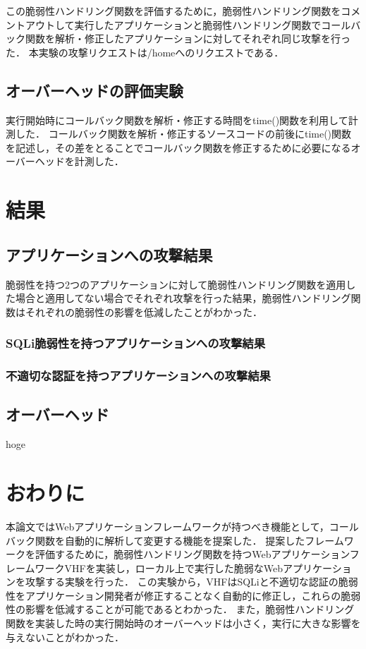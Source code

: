 \documentclass[a4paper,12pt]{jreport}
\begin{document}
この脆弱性ハンドリング関数を評価するために，脆弱性ハンドリング関数をコメントアウトして実行したアプリケーションと脆弱性ハンドリング関数でコールバック関数を解析・修正したアプリケーションに対してそれぞれ同じ攻撃を行った．
本実験の攻撃リクエストは/homeへのリクエストである．

\section{オーバーヘッドの評価実験}
実行開始時にコールバック関数を解析・修正する時間をtime()関数を利用して計測した．
コールバック関数を解析・修正するソースコードの前後にtime()関数を記述し，その差をとることでコールバック関数を修正するために必要になるオーバーヘッドを計測した．

\chapter{結果}
\section{アプリケーションへの攻撃結果}
脆弱性を持つ2つのアプリケーションに対して脆弱性ハンドリング関数を適用した場合と適用してない場合でそれぞれ攻撃を行った結果，脆弱性ハンドリング関数はそれぞれの脆弱性の影響を低減したことがわかった．

\subsection{SQLi脆弱性を持つアプリケーションへの攻撃結果}

\subsection{不適切な認証を持つアプリケーションへの攻撃結果}

\section{オーバーヘッド}
hoge

\chapter{おわりに}
本論文ではWebアプリケーションフレームワークが持つべき機能として，コールバック関数を自動的に解析して変更する機能を提案した．
提案したフレームワークを評価するために，脆弱性ハンドリング関数を持つWebアプリケーションフレームワークVHFを実装し，ローカル上で実行した脆弱なWebアプリケーションを攻撃する実験を行った．
この実験から，VHFはSQLiと不適切な認証の脆弱性をアプリケーション開発者が修正することなく自動的に修正し，これらの脆弱性の影響を低減することが可能であるとわかった．
また，脆弱性ハンドリング関数を実装した時の実行開始時のオーバーヘッドは小さく，実行に大きな影響を与えないことがわかった．
\end{document}
